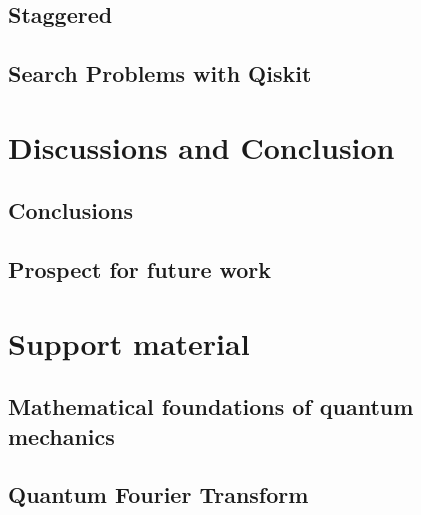\documentclass[
oneside,
11pt, a4paper,
footinclude=true,
headinclude=true,
cleardoublepage=empty
]{scrbook}
\begin{document}
\section{Staggered}

\section{Search Problems with Qiskit}


\chapter{Discussions and Conclusion}
\section{Conclusions}
\section{Prospect for future work}








\chapter{Support material}
\section{Mathematical foundations of quantum mechanics}

\section{Quantum Fourier Transform}\label{sec:chapQFT}


\end{document}
